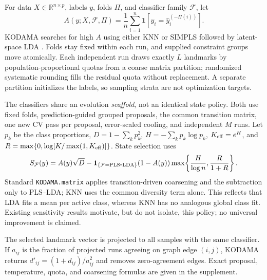 \documentclass[twoside,11pt]{article}
\begin{document}
For data $X\in\mathbb{R}^{n\times p}$, labels $y$, folds $\Pi$, and classifier family $\mathcal F$, let
\begin{equation}
  A(y;X,\mathcal F,\Pi)=\frac{1}{n}\sum_{i=1}^{n}\mathbf{1}\!\left[y_i=\widehat y_i^{(-\Pi(i))}\right].
\end{equation}
KODAMA searches for high $A$ using either KNN or SIMPLS followed by latent-space LDA \citep{dejong1993simpls}. Folds stay fixed within each run, and supplied constraint groups move atomically. Each independent run draws exactly $L$ landmarks by population-proportional quotas from a coarse matrix partition; randomized systematic rounding fills the residual quota without replacement. A separate partition initializes the labels, so sampling strata are not optimization targets.

The classifiers share an evolution \emph{scaffold}, not an identical state policy. Both use fixed folds, prediction-guided grouped proposals, the common transition matrix, one new CV pass per proposal, error-scaled cooling, and independent $M$ runs. Let $p_k$ be the class proportions, $D=1-\sum_kp_k^2$, $H=-\sum_kp_k\log p_k$, $K_{\rm eff}=e^H$, and $R=\max\{0,\log[K/\max(1,K_{\rm eff})]\}$. State selection uses
\begin{equation}
  S_{\mathcal F}(y)=A(y)\sqrt D-\mathbf{1}_{\{\mathcal F={\rm PLS\mbox{-}LDA}\}}(1-A(y))
  \max\!\left\{\frac{H}{\log n},\frac{R}{1+R}\right\}.
\end{equation}
Standard \texttt{KODAMA.matrix} applies transition-driven coarsening and the subtraction only to PLS--LDA; KNN uses the common diversity term alone. This reflects that LDA fits a mean per active class, whereas KNN has no analogous global class fit. Existing sensitivity results motivate, but do not isolate, this policy; no universal improvement is claimed.

The selected landmark vector is projected to all samples with the same classifier. If $a_{ij}$ is the fraction of projected runs agreeing on graph edge $(i,j)$, KODAMA returns $d'_{ij}=(1+d_{ij})/a_{ij}^{2}$ and removes zero-agreement edges. Exact proposal, temperature, quota, and coarsening formulas are given in the supplement.
\end{document}
